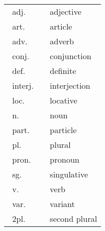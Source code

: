 \begin{refsection}

\begin{tabular}{lll}
\ adj.& \hspace{2em} & adjective\\
\ art.& &article\\
\ adv.& &adverb\\
\ conj.& &conjunction\\
\ def.& &definite\\
\ interj.& &interjection\\
\ loc.& &locative\\
\ n.& &noun\\
\ part.& &particle\\
\ pl.& &plural\\
\ pron.& &pronoun\\
\ sg.& & singulative\\
\ v.& &verb\\
\ var.& &variant\\
\ 2pl.& &second plural\\
\end{tabular}



\printbibliography[heading=subbibliography]
\end{refsection}